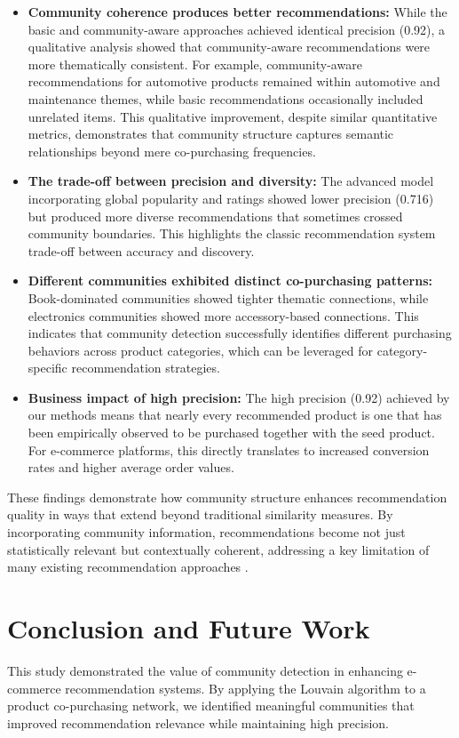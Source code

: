 \documentclass[conference]{IEEEtran}
\begin{document}
\begin{itemize}
  \item \textbf{Community coherence produces better recommendations:} While the basic and community-aware approaches achieved identical precision (0.92), a qualitative analysis showed that community-aware recommendations were more thematically consistent. For example, community-aware recommendations for automotive products remained within automotive and maintenance themes, while basic recommendations occasionally included unrelated items. This qualitative improvement, despite similar quantitative metrics, demonstrates that community structure captures semantic relationships beyond mere co-purchasing frequencies.
  
  \item \textbf{The trade-off between precision and diversity:} The advanced model incorporating global popularity and ratings showed lower precision (0.716) but produced more diverse recommendations that sometimes crossed community boundaries. This highlights the classic recommendation system trade-off between accuracy and discovery.
  
  \item \textbf{Different communities exhibited distinct co-purchasing patterns:} Book-dominated communities showed tighter thematic connections, while electronics communities showed more accessory-based connections. This indicates that community detection successfully identifies different purchasing behaviors across product categories, which can be leveraged for category-specific recommendation strategies.
  
  \item \textbf{Business impact of high precision:} The high precision (0.92) achieved by our methods means that nearly every recommended product is one that has been empirically observed to be purchased together with the seed product. For e-commerce platforms, this directly translates to increased conversion rates and higher average order values.
\end{itemize}

These findings demonstrate how community structure enhances recommendation quality in ways that extend beyond traditional similarity measures. By incorporating community information, recommendations become not just statistically relevant but contextually coherent, addressing a key limitation of many existing recommendation approaches \cite{shokrzadeh2022graph}.

\section{Conclusion and Future Work}
This study demonstrated the value of community detection in enhancing e-commerce recommendation systems. By applying the Louvain algorithm to a product co-purchasing network, we identified meaningful communities that improved recommendation relevance while maintaining high precision.
\end{document}
